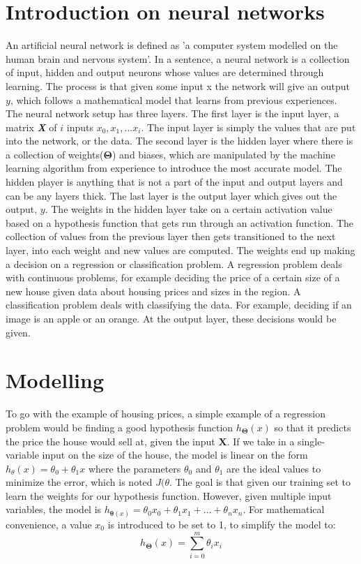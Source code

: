 \documentclass[a4paper,12pt]{article}
\begin{document}
\section{Introduction on neural networks}
An artificial neural network is defined as 'a computer system modelled on the human brain and nervous system'. In a sentence, a neural network is a collection of input, hidden and output neurons whose values are determined through learning. The process is that given some input x the network will give an output \(y\), which follows a mathematical model that learns from previous experiences. The neural network setup has three layers. The first layer is the input layer, a matrix \textbf{\emph{X}} of \(i\) inputs \(x_0,x_1,...x_i\). The input layer is simply the values that are put into the network, or the data. The second layer is the hidden layer where there is a collection of weights(\(\boldsymbol{\Theta}\)) and biases, which are manipulated by the machine learning algorithm from experience to introduce the most accurate model. The hidden player is anything that is not a part of the input and output layers and can be any layers thick. The last layer is the output layer which gives out the output, \(y\). The weights in the hidden layer take on a certain activation value based on a hypothesis function that gets run through an activation function. The collection of values from the previous layer then gets transitioned to the next layer, into each weight and new values are computed. The weights end up making a decision on a regression or classification problem. A regression problem deals with continuous problems, for example deciding the price of a certain size of a new house given data about housing prices and sizes in the region. A classification problem deals with classifying the data. For example, deciding if an image is an apple or an orange. At the output layer, these decisions would be given.

\section{Modelling}
To go with the example of housing prices, a simple example of a regression problem would be finding a good hypothesis function \(h_{\boldsymbol{\Theta}}(x)\) so that it predicts the price the house would sell at, given the input $\boldsymbol{X}$. If we take in a single-variable input on the size of the house, the model is linear on the form  \(h_\theta(x) = \theta_0 + \theta_1x\) where the parameters \(\theta_0\) and \(\theta_1\) are the ideal values to minimize the error, which is noted \(J(\theta\). The goal is that given our training set to learn the weights for our hypothesis function. However, given multiple input variables, the model is \(h_{\boldsymbol{\theta}(x)} = \theta_0x_0 + \theta_1x_1 + ... + \theta_nx_n\). For mathematical convenience, a value $x_0$ is introduced to be set to 1, to simplify the model to:
\[h_{\boldsymbol{\Theta}}(x) = \sum_{i = 0}^m \theta_ix_i\]
\end{document}
